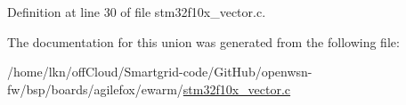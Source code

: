 Definition at line 30 of file stm32f10x\+\_\+vector.\+c.



The documentation for this union was generated from the following file\+:\begin{DoxyCompactItemize}
\item 
/home/lkn/off\+Cloud/\+Smartgrid-\/code/\+Git\+Hub/openwsn-\/fw/bsp/boards/agilefox/ewarm/\hyperlink{agilefox_2ewarm_2stm32f10x__vector_8c}{stm32f10x\+\_\+vector.\+c}\end{DoxyCompactItemize}
